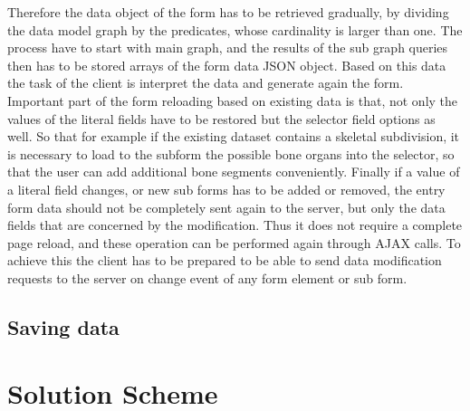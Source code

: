 Therefore the data object of the form has to be retrieved gradually, by dividing the data model graph by the predicates, whose cardinality is larger than one. The process have to start with main graph, and the results of the sub graph queries then has to be stored arrays of the form data JSON object. Based on this data the task of the client is interpret the data and generate again the form. Important part of the form reloading based on existing data is that, not only the values of the literal fields have to be restored but the selector field options as well. So that for example if the existing dataset contains a skeletal subdivision, it is necessary to load to the subform the possible bone organs into the selector, so that the user can add additional bone segments conveniently.
Finally if a value of a literal field changes, or new sub forms has to be added or removed, the entry form data should not be completely sent again to the server, but only the data fields that are concerned by the modification. Thus it does not require a complete page reload, and these operation can be performed again through AJAX calls. To achieve this the client has to be prepared to be able to send data modification requests to the server on change event of any form element or sub form.

\subsection{Saving data}


\section{Solution Scheme} \label{33}








